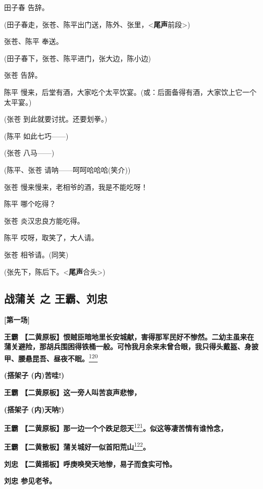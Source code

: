 田子春 告辞。

(田子春走，张苍、陈平出门送，陈外、张里，\textless{}\textbf{尾声}前段\textgreater{})

张苍、陈平 奉送。

(田子春下，张苍、陈平进门，张大边，陈小边)

张苍 告辞。

陈平
慢来，后堂有酒，大家吃个太平饮宴。(或：后面备得有酒，大家饮上它一个太平宴。)

(张苍 到此就要讨扰。还要划拳。)

(陈平 如此七巧------)

(张苍 八马------)

(陈平、张苍 请呐------呵呵哈哈哈(笑介))

张苍 慢来慢来，老相爷的酒，我是不能吃呀！

陈平 哪个吃得？

张苍 炎汉忠良方能吃得。

陈平 哎呀，取笑了，大人请。

张苍 相爷请。(同笑)

(张先下，陈后下。\textless{}\textbf{尾声}合头\textgreater{})

\newpage
\hypertarget{ux6218ux84b2ux5173-ux4e4b-ux738bux9738ux5218ux5fe0}{%
\subsection{战蒲关 之
王霸、刘忠}\label{ux6218ux84b2ux5173-ux4e4b-ux738bux9738ux5218ux5fe0}}

\textbf{{[}第一场{]}}

\textbf{王霸
【二黄原板】恨贼臣暗地里长安城献，害得那军民好不惨然。二幼主虽来在蒲关避险，那胡兵围困得铁桶一般。可怜我月余来未曾合眼，我只得头戴盔、身披甲、腰悬昆吾、昼夜不眠。}\protect\hyperlink{fn120}{\textsuperscript{120}}

\textbf{(搭架子 (内)苦哇!)}

\textbf{王霸 【二黄原板】这一旁人叫苦哀声悲惨，}

\textbf{(搭架子 (内)天呐!)}

\textbf{王霸
【二黄原板】那一边一个个跌足怨天}\protect\hyperlink{fn121}{\textsuperscript{121}}\textbf{。似这等凄苦情有谁怜念，}

\textbf{王霸
【二黄散板】蒲关城好一似首阳荒山}\protect\hyperlink{fn122}{\textsuperscript{122}}\textbf{。}

\textbf{刘忠 【二黄摇板】呼庚唤癸天地惨，易子而食实可怜。}

\textbf{刘忠 参见老爷。}

